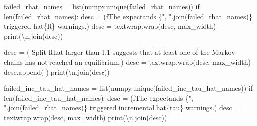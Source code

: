 \documentclass[
  letterpaper,
  DIV=11,
  numbers=noendperiod]{scrartcl}
\newenvironment{Shaded}{\begin{snugshade}}{\end{snugshade}}
\newcommand{\BuiltInTok}[1]{\textcolor[rgb]{0.00,0.23,0.31}{#1}}
\newcommand{\CharTok}[1]{\textcolor[rgb]{0.13,0.47,0.30}{#1}}
\newcommand{\ControlFlowTok}[1]{\textcolor[rgb]{0.00,0.23,0.31}{#1}}
\newcommand{\NormalTok}[1]{\textcolor[rgb]{0.00,0.23,0.31}{#1}}
\newcommand{\OperatorTok}[1]{\textcolor[rgb]{0.37,0.37,0.37}{#1}}
\newcommand{\SpecialCharTok}[1]{\textcolor[rgb]{0.37,0.37,0.37}{#1}}
\newcommand{\SpecialStringTok}[1]{\textcolor[rgb]{0.13,0.47,0.30}{#1}}
\newcommand{\StringTok}[1]{\textcolor[rgb]{0.13,0.47,0.30}{#1}}
\begin{document}
\begin{Shaded}
\begin{Highlighting}[]
\NormalTok{  failed\_rhat\_names }\OperatorTok{=} \BuiltInTok{list}\NormalTok{(numpy.unique(failed\_rhat\_names))}
  \ControlFlowTok{if} \BuiltInTok{len}\NormalTok{(failed\_rhat\_names):}
\NormalTok{    desc }\OperatorTok{=}\NormalTok{ (}\SpecialStringTok{f\textquotesingle{}The expectands }\SpecialCharTok{\{}\StringTok{", "}\SpecialCharTok{.}\NormalTok{join(failed\_rhat\_names)}\SpecialCharTok{\}}\SpecialStringTok{ \textquotesingle{}}
             \StringTok{\textquotesingle{}triggered hat}\SpecialCharTok{\{R\}}\StringTok{ warnings.\textquotesingle{}}\NormalTok{)}
\NormalTok{    desc }\OperatorTok{=}\NormalTok{ textwrap.wrap(desc, max\_width)}
    \BuiltInTok{print}\NormalTok{(}\StringTok{\textquotesingle{}}\CharTok{\textbackslash{}n}\StringTok{\textquotesingle{}}\NormalTok{.join(desc))}
    
\NormalTok{    desc }\OperatorTok{=}\NormalTok{ (}\StringTok{\textquotesingle{}  Split Rhat larger than 1.1 suggests that at \textquotesingle{}}
            \StringTok{\textquotesingle{}least one of the Markov chains has not reached \textquotesingle{}}
            \StringTok{\textquotesingle{}an equilibrium.\textquotesingle{}}\NormalTok{)}
\NormalTok{    desc }\OperatorTok{=}\NormalTok{ textwrap.wrap(desc, max\_width)}
\NormalTok{    desc.append(}\StringTok{\textquotesingle{} \textquotesingle{}}\NormalTok{)}
    \BuiltInTok{print}\NormalTok{(}\StringTok{\textquotesingle{}}\CharTok{\textbackslash{}n}\StringTok{\textquotesingle{}}\NormalTok{.join(desc))}

\NormalTok{  failed\_inc\_tau\_hat\_names }\OperatorTok{=} \BuiltInTok{list}\NormalTok{(numpy.unique(failed\_inc\_tau\_hat\_names))}
  \ControlFlowTok{if} \BuiltInTok{len}\NormalTok{(failed\_inc\_tau\_hat\_names):}
\NormalTok{    desc }\OperatorTok{=}\NormalTok{ (}\SpecialStringTok{f\textquotesingle{}The expectands }\SpecialCharTok{\{}\StringTok{", "}\SpecialCharTok{.}\NormalTok{join(failed\_rhat\_names)}\SpecialCharTok{\}}\SpecialStringTok{ \textquotesingle{}}
             \StringTok{\textquotesingle{}triggered incremental hat}\SpecialCharTok{\{tau\}}\StringTok{ warnings.\textquotesingle{}}\NormalTok{)}
\NormalTok{    desc }\OperatorTok{=}\NormalTok{ textwrap.wrap(desc, max\_width)}
    \BuiltInTok{print}\NormalTok{(}\StringTok{\textquotesingle{}}\CharTok{\textbackslash{}n}\StringTok{\textquotesingle{}}\NormalTok{.join(desc))}


\end{Highlighting}
\end{Shaded}
\end{document}
